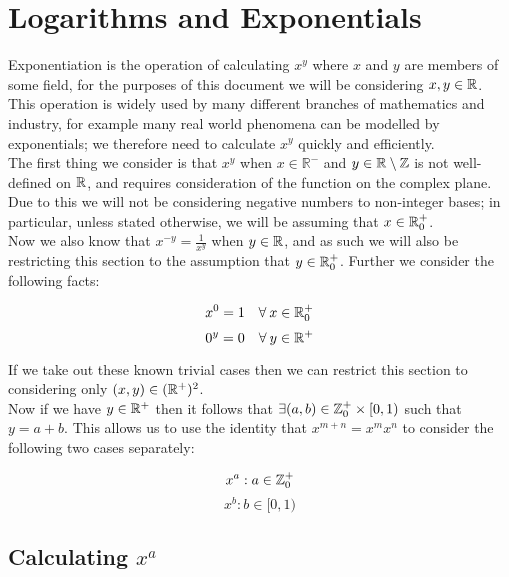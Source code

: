 \section{Logarithms and Exponentials}

Exponentiation is the operation of calculating \(x^y\) where \(x\) and \(y\) are members of some field, for the purposes of this document we will be considering \(x, y \in \mathbb{R}\). This operation is widely used by many different branches of mathematics and industry, for example many real world phenomena can be modelled by exponentials\cite{ONL_ExpPres}; we therefore need to calculate \(x^y\) quickly and efficiently.\\

The first thing we consider is that \(x^y\) when \(x \in \mathbb{R}^{-}\) and \(y \in \mathbb{R}\setminus\mathbb{Z}\) is not well-defined on \(\mathbb{R}\), and requires consideration of the function on the complex plane. Due to this we will not be considering negative numbers to non-integer bases; in particular, unless stated otherwise, we will be assuming that \(x \in \mathbb{R}^+_0\).\\

Now we also know that \(x^{-y} = \frac{1}{x^y}\) when \(y \in \mathbb{R}\), and as such we will also be restricting this section to the assumption that \(y \in \mathbb{R}^+_0\). Further we consider the following facts: 

\[x^0 = 1\quad \forall\: x \in \mathbb{R}^+_0\]
\[0^y = 0\quad \forall\: y \in \mathbb{R}^+\]

If we take out these known trivial cases then we can restrict this section to considering only \((x, y) \in (\mathbb{R}^+)^2\).\\

Now if we have \(y \in \mathbb{R}^+\) then it follows that \(\exists (a, b) \in \mathbb{Z}^+_0 \times [0,1)\) such that \(y = a + b\). This allows us to use the identity that \(x^{m+n} = x^mx^n\) to consider the following two cases separately:

\begin{equation}
\label{EQN_"exp case 1"}
	x^a : a \in \mathbb{Z}^+_0
\end{equation}
\begin{equation}
\label{EQN_"exp case 2"}
	x^b : b \in [0,1)
\end{equation}

\subsection{Calculating \(x^a\)}

